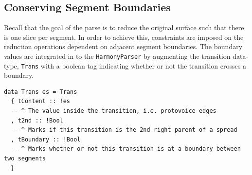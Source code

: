 \documentclass[12pt,a4paper,twoside,openany]{report} \usepackage[pdfborder={0 0 0}]{hyperref}    %
\theoremstyle{definition} \newtheorem{definition}{Definition}[section]
\begin{document}
  \subsection{Conserving Segment Boundaries}
  \label{sub:boundaryHandling}

  Recall that the goal of the parse is to reduce the original surface such that there is one slice per segment. 
  In order to achieve this, constraints are imposed on the reduction operations dependent on adjacent segment boundaries. The boundary values are integrated in to the \texttt{HarmonyParser} by augmenting the transition data-type,
  \texttt{Trans} with a boolean tag indicating whether or not the transition crosses a boundary.

    \begin{lstlisting}[caption={Transition Data-type}, captionpos=b] 
data Trans es = Trans
  { tContent :: !es
  -- ^ The value inside the transition, i.e. protovoice edges
  , t2nd :: !Bool
  -- ^ Marks if this transition is the 2nd right parent of a spread
  , tBoundary :: !Bool
  -- ^ Marks whether or not this transition is at a boundary between two segments
  }
    \end{lstlisting}
\end{document}
